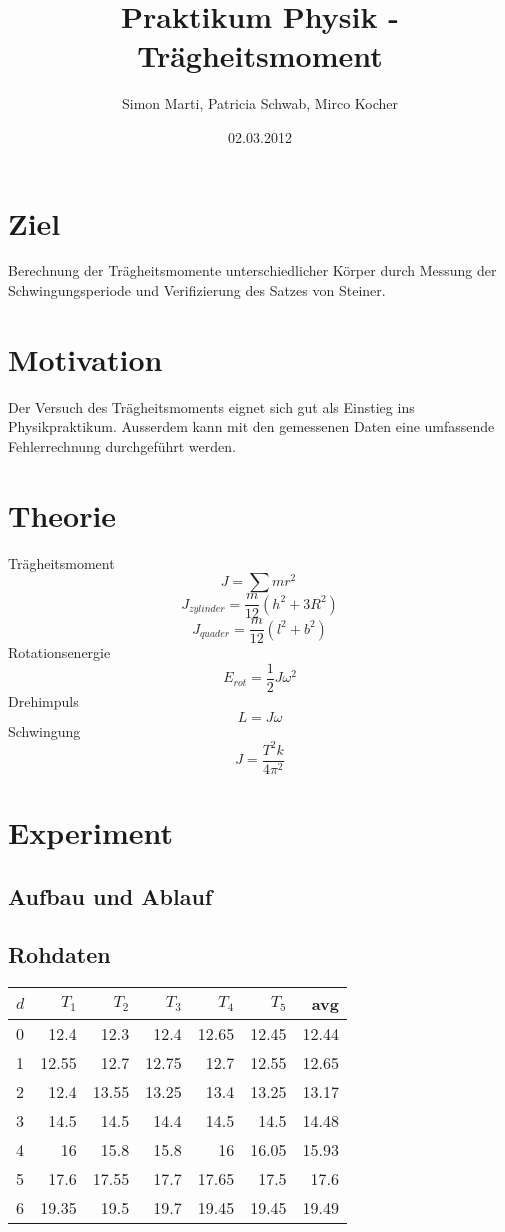 \documentclass[12pt,a4paper]{article}
\title{Praktikum Physik - Tr\"agheitsmoment}
\author{Simon Marti, Patricia Schwab, Mirco Kocher}
\date{02.03.2012}
\begin{document}
\maketitle

\section*{Ziel}
 Berechnung der Tr\"agheitsmomente unterschiedlicher K\"orper durch Messung der Schwingungsperiode und Verifizierung des Satzes von Steiner.

\section*{Motivation}
Der Versuch des Tr\"agheitsmoments eignet sich gut als Einstieg ins Physikpraktikum. Ausserdem kann mit den gemessenen Daten eine umfassende Fehlerrechnung durchgef\"uhrt werden.

\section*{Theorie}

Tr\"agheitsmoment
\[  J = \sum mr^2\ \]
\[  J_{zylinder} = \frac{m}{12}(h^2 + 3R^2) \]
\[ J_{quader} = \frac{m}{12}(l^2 + b^2) \]
Rotationsenergie
\[ E_{rot} = \frac{1}{2}J\omega^2 \]
Drehimpuls
\[ L = J\omega \]
Schwingung
\[ J = \frac{T^2k}{4\pi^2} \]

\section*{Experiment}

\subsection*{Aufbau und Ablauf}

\subsection*{Rohdaten}

\begin{tabular}{|l|r|r|r|r|r|r|}
\hline
$d$&$T_1$&$T_2$&$T_3$&$T_4$&$T_5$&avg \\
\hline
0&12.4&12.3&12.4&12.65&12.45&12.44\\
1&12.55&12.7&12.75&12.7&12.55&12.65\\
2&12.4&13.55&13.25&13.4&13.25&13.17\\
3&14.5&14.5&14.4&14.5&14.5&14.48\\
4&16&15.8&15.8&16&16.05&15.93\\
5&17.6&17.55&17.7&17.65&17.5&17.6\\
6&19.35&19.5&19.7&19.45&19.45&19.49\\
\hline
\end{tabular}
\end{document}
